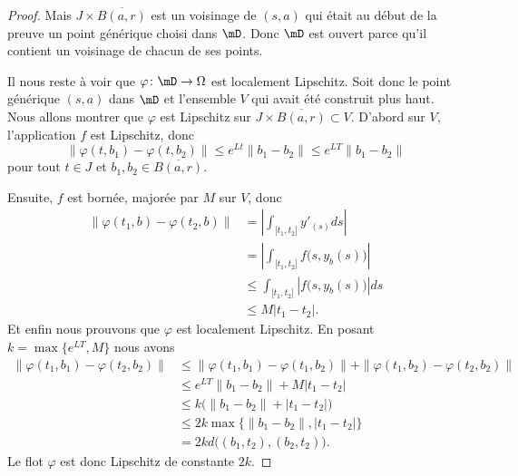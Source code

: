 \begin{proof}
    Mais \( J\times \overline{ B(a,r) }\) est un voisinage de \( (s,a)\) qui était au début de la preuve un point générique choisi dans \( \mD\). Donc \( \mD\) est ouvert parce qu'il contient un voisinage de chacun de ses points.

    Il nous reste à voir que \( \varphi\colon \mD\to \Omega\) est localement Lipschitz. Soit donc le point générique \( (s,a)\) dans \( \mD\) et l'ensemble $V$ qui avait été construit plus haut. Nous allons montrer que \( \varphi\) est Lipschitz sur \( J\times \overline{ B(a,r) }\subset V\). D'abord sur \( V\), l'application \( f\) est Lipschitz, donc
    \begin{equation}
         \| \varphi(t,b_1)-\varphi(t,b_2) \|\leq  e^{Lt}\| b_1-b_2 \|
         \leq  e^{LT}\| b_1-b_2 \|
    \end{equation}
    pour tout \( t\in J\) et \( b_1,b_2\in \overline{ B(a,r) }\).

    Ensuite, \( f\) est bornée, majorée par \( M\) sur $V$, donc
    \begin{subequations}
        \begin{align}
            \| \varphi(t_1,b)-\varphi(t_2,b) \|&=| \int_{\mathopen[ t_1 , t_2 \mathclose]} y'_(s)ds |\\
            &=| \int_{\mathopen[ t_1 , t_2 \mathclose]}f\big( s,y_b(s) \big) |\\
            &\leq \int_{\mathopen[ t_1 , t_2 \mathclose]}| f\big( s,y_b(s) \big) |ds\\
            &\leq M| t_1-t_2 |.
        \end{align}
    \end{subequations}
    Et enfin nous prouvons que \( \varphi\) est localement Lipschitz. En posant \( k=\max\{  e^{LT},M \}\) nous avons
    \begin{subequations}
        \begin{align}
            \| \varphi(t_1,b_1)-\varphi(t_2,b_2) \|&\leq \| \varphi(t_1,b_1)-\varphi(t_1,b_2) \|+\| \varphi(t_1,b_2)-\varphi(t_2,b_2) \|\\
            &\leq  e^{LT}\| b_1-b_2 \|+M| t_1-t_2 |\\
            &\leq k\big( \| b_1-b_2 \|+| t_1-t_2 | \big)\\
            &\leq 2k\max\{ \| b_1-b_2 \|,| t_1-t_2 | \}\\
            &=2kd\big(  (b_1,t_2),(b_2,t_2)  \big).
        \end{align}
    \end{subequations}
    Le flot \( \varphi\) est donc Lipschitz de constante \( 2k\).
\end{proof}

